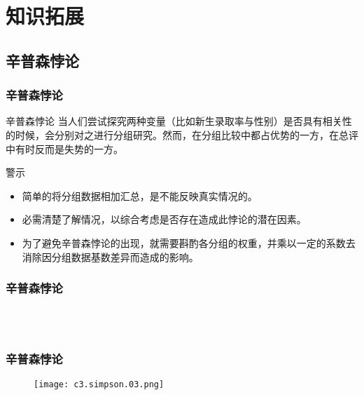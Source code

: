 \section{知识拓展}
\subsection{辛普森悖论}
\begin{frame}
  \frametitle{辛普森悖论}
  \begin{block}{辛普森悖论}
当人们尝试探究两种变量（比如新生录取率与性别）是否具有相关性的时候，会分别对之进行分组研究。然而，在分组比较中都占优势的一方，在总评中有时反而是失势的一方。
  \end{block}
  \pause
  \begin{block}{警示}
    \begin{itemize}
      \item 简单的将分组数据相加汇总，是不能反映真实情况的。
      \item 必需清楚了解情况，以综合考虑是否存在造成此悖论的潜在因素。
      \item 为了避免辛普森悖论的出现，就需要斟酌各分组的权重，并乘以一定的系数去消除因分组数据基数差异而造成的影响。
    \end{itemize}
  \end{block}
\end{frame}

\begin{frame}
  \frametitle{辛普森悖论}
  \begin{figure}
    \centering
    \\
    \vspace{0.5em}
    \\
    \vspace{0.5em}
  \end{figure}
\end{frame}

\begin{frame}
  \frametitle{辛普森悖论}
  \begin{figure}
    \centering
    \texttt{[image: c3.simpson.03.png]}
  \end{figure}
\end{frame}

